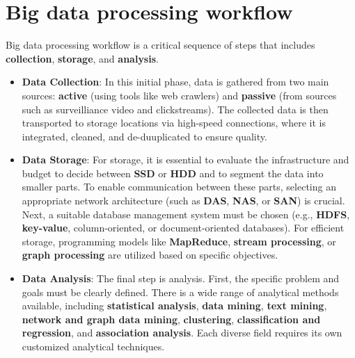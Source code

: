 \section{ Big data processing workflow }
    Big data processing workflow is a critical sequence of steps that includes
    \textbf{collection}, \textbf{storage}, and \textbf{analysis}.
    \begin{itemize}
        \item \textbf{Data Collection}: In this initial phase, data is gathered    
            from two main sources: \textbf{active} (using tools like web
            crawlers) and \textbf{passive} (from sources such as surveilliance
            video and clickstreams). The collected data is then transported to
            storage locations via high-speed connections, where it is
            integrated, cleaned, and de-duuplicated to ensure quality.
        \item \textbf{Data Storage}: For storage, it is essential to evaluate
            the infrastructure and budget to decide between \textbf{SSD} or
            \textbf{HDD} and to segment the data into smaller parts. To enable
            communication between these parts, selecting an appropriate network
            architecture (such as \textbf{DAS}, \textbf{NAS}, or \textbf{SAN})
            is crucial. Next, a suitable database management system must be
            chosen (e.g., \textbf{HDFS}, \textbf{key-value}, column-oriented,
            or document-oriented databases). For efficient storage, programming
            models like \textbf{MapReduce}, \textbf{stream processing}, or
            \textbf{graph processing} are utilized based on specific
            objectives.
        \item \textbf{Data Analysis}: The final step is analysis. First, the
            specific problem and goals must be clearly defined. There is a
            wide range of analytical methods available, including
            \textbf{statistical analysis}, \textbf{data mining},
            \textbf{text mining}, \textbf{network and graph data mining},
            \textbf{clustering}, \textbf{classification and regression}, and
            \textbf{association analysis}. Each diverse field requires its
            own customized analytical techniques.
    \end{itemize}


